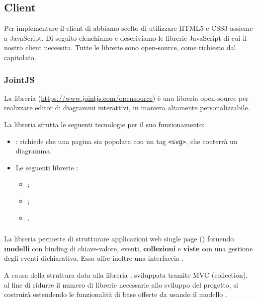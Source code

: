 


\subsection{Client}
Per implementare il client di \proj{} abbiamo scelto di utilizzare HTML5 e CSS3 assieme a JavaScript. Di seguito elenchiamo e descriviamo le librerie JavaScript di cui il nostro client necessita. Tutte le librerie sono open-source, come richiesto dal capitolato.

\subsubsection{JointJS}
La libreria \jointjs{} (\url{https://www.jointjs.com/opensource}) è una libreria open-source per realizzare editor di diagrammi interattivi, in maniera altamente personalizzabile. %

La libreria sfrutta le seguenti tecnologie per il suo funzionamento:

\begin{itemize}
	\item \html{}: \jointjs{} richiede che una pagina \html{} sia popolata con un tag \texttt{<svg>}, che conterrà un diagramma.
	\item Le seguenti librerie \js{}:
	\begin{itemize}
		\item \jquery{};
		\item \lodash{};
		\item \backbonejs{}.
	\end{itemize}
\end{itemize}

\subsubsection{\backbonejs}
La libreria \backbonejs{} permette di strutturare applicazioni web single page () fornendo \textbf{modelli} con binding di chiave-valore, eventi, \textbf{collezioni} e \textbf{viste} con una gestione degli eventi dichiarativa. Essa offre inoltre una interfaccia .

A causa della struttura data alla libreria \jointjs{}, sviluppata tramite MVC (collection), al fine di ridurre il numero di librerie necessarie allo sviluppo del progetto, si costruirà \proj{} estendendo le funzionalità di base offerte da \jointjs{} usando il modello \mvc{}.


